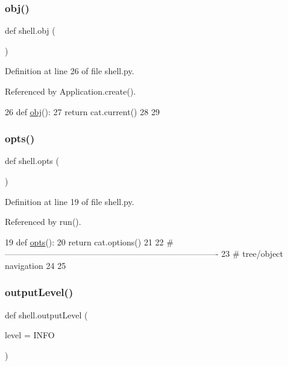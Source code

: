 \subsubsection{\texorpdfstring{obj()}{obj()}}
{\footnotesize\ttfamily def shell.\+obj (\begin{DoxyParamCaption}{ }\end{DoxyParamCaption})}



Definition at line 26 of file shell.\+py.



Referenced by Application.\+create().


\begin{DoxyCode}
26 \textcolor{keyword}{def }\hyperlink{namespaceshell_a7c2aab80550f476d91e0d8f0c350a635}{obj}():
27   \textcolor{keywordflow}{return} cat.current()
28 
29 
\end{DoxyCode}
\mbox{\label{namespaceshell_ac20d6d8d358a08b077ebca4dc98eca96}} 
\subsubsection{\texorpdfstring{opts()}{opts()}}
{\footnotesize\ttfamily def shell.\+opts (\begin{DoxyParamCaption}{ }\end{DoxyParamCaption})}



Definition at line 19 of file shell.\+py.



Referenced by run().


\begin{DoxyCode}
19 \textcolor{keyword}{def }\hyperlink{namespaceshell_ac20d6d8d358a08b077ebca4dc98eca96}{opts}():
20   \textcolor{keywordflow}{return} cat.options()
21 
22 \textcolor{comment}{#----------------------------------------------------------------------------}
23 \textcolor{comment}{# tree/object navigation}
24 
25 
\end{DoxyCode}
\mbox{\label{namespaceshell_ae17d022e61c0f8d61c3dee4f9bc68f51}} 
\subsubsection{\texorpdfstring{output\+Level()}{outputLevel()}}
{\footnotesize\ttfamily def shell.\+output\+Level (\begin{DoxyParamCaption}\item[{}]{level = {\ttfamily \textquotesingle{}INFO\textquotesingle{}} }\end{DoxyParamCaption})}



